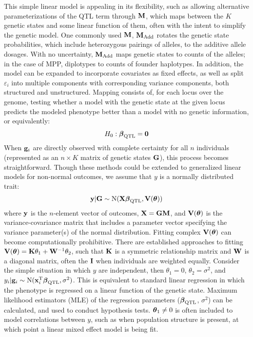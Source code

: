 This simple linear model is appealing in its flexibility, such as allowing alternative parameterizations of the QTL term through $\mathbf{M}$, which maps between the $K$ genetic states and some linear function of them, often with the intent to simplify the genetic model. One commonly used $\mathbf{M}$, $\mathbf{M}_{\text{Add}}$ rotates the genetic state probabilities, which include heterozygous pairings of alleles, to the additive allele dosages. With no uncertainty, $\mathbf{M}_{\text{Add}}$ maps genetic states to counts of the alleles; in the case of MPP, diplotypes to counts of founder haplotypes. In addition, the model can be expanded to incorporate covariates as fixed effects, as well as split $\varepsilon_{i}$ into multiple components with corresponding variance components, both structured and unstructured. Mapping consists of, for each locus over the genome, testing whether a model with the genetic state at the given locus predicts the modeled phenotype better than a model with no genetic information, or equivalently: 
\begin{equation*}
	H_{0}: \boldsymbol{\beta}_{\text{QTL}} = \mathbf{0}
\end{equation*}
 When $\mathbf{g}_{i}$ are directly observed with complete certainty for all $n$ individuals (represented as an $n \times K$ matrix of genetic states $\mathbf{G}$), this process becomes straightforward. Though these methods could be extended to generalized linear models for non-normal outcomes, we assume that $y$ is a normally distributed trait: 
\begin{equation*}
 	\mathbf{y} | \mathbf{G} \sim \text{N}(\mathbf{X}\boldsymbol{\beta}_{\text{QTL}}, \mathbf{V}(\boldsymbol{\theta}))
\end{equation*}
where $\mathbf{y}$ is the $n$-element vector of outcomes, $\mathbf{X} = \mathbf{G}\mathbf{M}$, and $\mathbf{V}(\boldsymbol{\theta})$ is the variance-covariance matrix that includes a parameter vector specifying the variance parameter(s) of the normal distribution. Fitting complex $\mathbf{V}(\boldsymbol{\theta})$ can become computationally prohibitive. There are established approaches to fitting $\mathbf{V}(\boldsymbol{\theta}) = \mathbf{K}\theta_{1} + \mathbf{W}^{-1}\theta_{2}$, such that $\mathbf{K}$ is a symmetric relationship matrix and $\mathbf{W}$ is a diagonal matrix, often the $\mathbf{I}$ when individuals are weighted equally. Consider the simple situation in which $y$ are independent, then $\theta_{1} = 0$, $\theta_{2} = \sigma^{2}$, and $y_{i} | \mathbf{g}_{i} \sim \text{N}(\mathbf{x}^{\text{T}}_{i}\boldsymbol{\beta}_{\text{QTL}}, \sigma^{2})$. This is equivalent to standard linear regression in which the phenotype is regressed on a linear function of the genetic state. Maximum likelihood estimators (MLE) of the regression parameters ($\boldsymbol{\beta}_{\text{QTL}}$, $\sigma^{2}$) can be calculated, and used to conduct hypothesis tests. $\boldsymbol{\theta}_{1} \neq 0$ is often included to model correlations between $y$, such as when population structure is present, at which point a linear mixed effect model is being fit.

